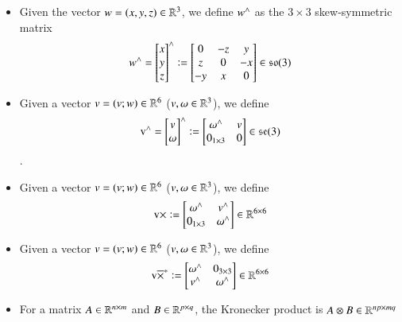 \begin{itemize}
    \item Given the vector $w = (x,y,z) \in \mathbb{R}^{3}$, we define $w^{\wedge}$ as the $3\times3$ skew-symmetric matrix
    \begin{equation}\label{def_skew_symmetric_matrix}
        w^{\wedge} = 
        \begin{bmatrix}
            x\\y\\z
        \end{bmatrix}^\wedge
     \vcentcolon=
    \begin{bmatrix}
        0 & -z & y\\
        z & 0 & -x\\
        -y & x & 0
    \end{bmatrix}
    \in \mathfrak{so}(3)
    \end{equation}

    \item Given a vector $v = (v; w) \in \mathbb{R}^{6}$ ($v, \omega \in \mathbb{R}^{3}$), we define
    \begin{equation}
        \text{v}^{\wedge} =
        \begin{bmatrix}
            v\\ \omega
        \end{bmatrix}^\wedge \vcentcolon=
        \begin{bmatrix}
            \omega^{\wedge} & v\\
            0_{1\times3} & 0
        \end{bmatrix}
        \in \mathfrak{se}(3)
    \end{equation}.

    \item Given a vector $v = (v; w) \in \mathbb{R}^{6}$ ($v, \omega \in \mathbb{R}^{3}$), we define
    \begin{equation}
        \text{v}\times \vcentcolon=
        \begin{bmatrix}
            \omega^{\wedge} & v^{\wedge}\\
            0_{1\times3} & \omega^{\wedge}
        \end{bmatrix}
        \in \mathbb{R}^{6\times6}
    \end{equation}

    \item Given a vector $v = (v; w) \in \mathbb{R}^{6}$ ($v, \omega \in \mathbb{R}^{3}$), we define
    \begin{equation}
        \text{v}\overline{\times}^{*} \vcentcolon=
        \begin{bmatrix}
            \omega^{\wedge} & 0_{3\times 3}\\
            v^{\wedge} & \omega^{\wedge}
        \end{bmatrix}
        \in \mathbb{R}^{6\times6}
    \end{equation}

    \item For a matrix $A \in \mathbb{R}^{n\times m}$ and $B\in \mathbb{R}^{p\times q}$, the Kronecker product is $A\otimes B \in \mathbb{R}^{np\times mq}$
\end{itemize}

